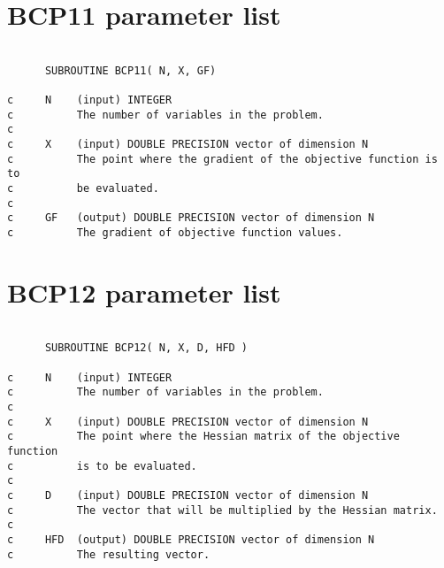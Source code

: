 \section{BCP11 parameter list}
\begin{verbatim}

      SUBROUTINE BCP11( N, X, GF)

c     N    (input) INTEGER
c          The number of variables in the problem.
c
c     X    (input) DOUBLE PRECISION vector of dimension N
c          The point where the gradient of the objective function is to 
c          be evaluated.
c
c     GF   (output) DOUBLE PRECISION vector of dimension N
c          The gradient of objective function values.
\end{verbatim}

\section{BCP12 parameter list}
\begin{verbatim}

      SUBROUTINE BCP12( N, X, D, HFD )

c     N    (input) INTEGER
c          The number of variables in the problem.
c
c     X    (input) DOUBLE PRECISION vector of dimension N
c          The point where the Hessian matrix of the objective function 
c          is to be evaluated.
c
c     D    (input) DOUBLE PRECISION vector of dimension N
c          The vector that will be multiplied by the Hessian matrix.
c
c     HFD  (output) DOUBLE PRECISION vector of dimension N
c          The resulting vector.  
\end{verbatim}



